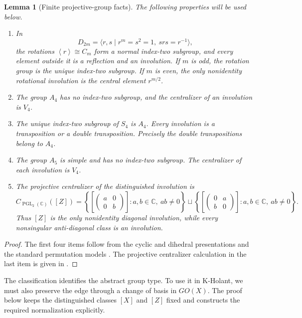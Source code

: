 \documentclass[11pt,letterpaper,onecolumn]{article}
\theoremstyle{plain}
\newtheorem{lemma}[lemma]{Lemma}
\theoremstyle{definition}
\theoremstyle{remark}
\newcommand{\angles}[1]{\left\langle #1\right\rangle}
\newcommand{\PGL}{\operatorname{PGL}}
\begin{document}
	\begin{lemma}[Finite projective-group facts]
		\label{lem:finite-pgl2-facts}
		The following properties will be used below.
		\begin{enumerate}
			\item In
			\[
			D_{2m}=\langle r,s\mid r^m=s^2=1,\ srs=r^{-1}\rangle,
			\]
			the rotations \(\angles r\cong C_m\) form a normal index-two
			subgroup, and every element outside it is a reflection and an
			involution.  If \(m\) is odd, the rotation group is the unique
			index-two subgroup.  If \(m\) is even, the only nonidentity
			rotational involution is the central element \(r^{m/2}\).
			\item The group \(A_4\) has no index-two subgroup, and the centralizer
			of an involution is \(V_4\).
			\item The unique index-two subgroup of \(S_4\) is \(A_4\).  Every
			involution is a transposition or a double transposition. Precisely
			the double transpositions belong to \(A_4\).
			\item The group \(A_5\) is simple and has no index-two subgroup.  The
			centralizer of each involution is \(V_4\).
			\item The projective centralizer of the distinguished involution is
			\[
			C_{\PGL_2(\mathbb C)}([Z])
			=
			\left\{
			\left[\begin{pmatrix}a&0\\0&b\end{pmatrix}\right]:a,b\in\mathbb C,\ ab\ne0
			\right\}
			\sqcup
			\left\{
			\left[\begin{pmatrix}0&a\\b&0\end{pmatrix}\right]:a,b\in\mathbb C,\ ab\ne0
			\right\}.
			\]
			Thus \([Z]\) is the only nonidentity diagonal involution, while
			every nonsingular anti-diagonal class is an involution.
		\end{enumerate}
	\end{lemma}
	
	\begin{proof}
		The first four items follow from the cyclic and dihedral presentations
		and the standard permutation models \cite{DixonMortimer1996}.
		The projective centralizer calculation in the last item is given in
		\cite[Lemma~2.2]{Liu2026DEQ2Holant}.
	\end{proof}
	
	The classification identifies the abstract group type. To use it in
	K-Holant, we must also preserve the edge through a change of basis in
	\(GO(X)\). The proof below keeps the distinguished classes \([X]\) and
	\([Z]\) fixed and constructs the required normalization explicitly.
	
\end{document}
